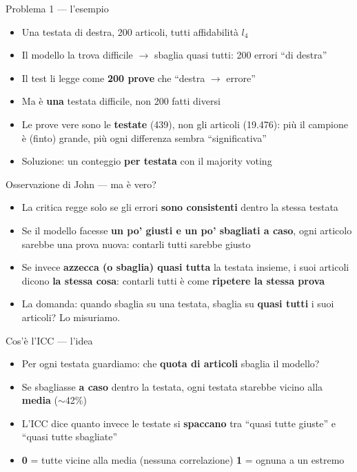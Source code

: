 \documentclass[aspectratio=169]{beamer}
\newcommand{\hl}[1]{\textbf{#1}}
\begin{document}
\begin{frame}{Problema 1 --- l'esempio}
  \vfill
  \begin{itemize}[<+->]
    \setlength\itemsep{0.7em}
    \item Una testata di destra, 200 articoli, tutti affidabilit\`a $l_4$
    \item Il modello la trova difficile $\rightarrow$ sbaglia quasi tutti: 200 errori ``di destra''
    \item Il test li legge come \hl{200 prove} che ``destra $\rightarrow$ errore''
    \item Ma \`e \hl{una} testata difficile, non 200 fatti diversi
    \item Le prove vere sono le \hl{testate} (439), non gli articoli (19.476): pi\`u il campione \`e (finto) grande, pi\`u ogni differenza sembra ``significativa''
    \item Soluzione: un conteggio \hl{per testata} con il majority voting
  \end{itemize}
  \vfill
\end{frame}

\begin{frame}{Osservazione di John --- ma \`e vero?}
  \vfill
  \begin{itemize}[<+->]
    \setlength\itemsep{0.8em}
    \item La critica regge solo se gli errori \hl{sono consistenti} dentro la stessa testata
    \item Se il modello facesse \hl{un po' giusti e un po' sbagliati a caso}, ogni articolo sarebbe una prova nuova: contarli tutti sarebbe giusto
    \item Se invece \hl{azzecca (o sbaglia) quasi tutta} la testata insieme, i suoi articoli dicono \hl{la stessa cosa}: contarli tutti \`e come \hl{ripetere la stessa prova}
    \item La domanda: quando sbaglia su una testata, sbaglia su \hl{quasi tutti} i suoi articoli? \quad Lo misuriamo.
  \end{itemize}
  \vfill
\end{frame}

\begin{frame}{Cos'\`e l'ICC --- l'idea}
  \vfill
  \begin{itemize}[<+->]
    \setlength\itemsep{0.8em}
    \item Per ogni testata guardiamo: che \hl{quota di articoli} sbaglia il modello?
    \item Se sbagliasse \hl{a caso} dentro la testata, ogni testata starebbe vicino alla \hl{media} ($\sim$42\%)
    \item L'ICC dice quanto invece le testate si \hl{spaccano} tra ``quasi tutte giuste'' e ``quasi tutte sbagliate''
    \item \hl{0} = tutte vicine alla media (nessuna correlazione) \quad \hl{1} = ognuna a un estremo
  \end{itemize}
  \vfill
\end{frame}
\end{document}

